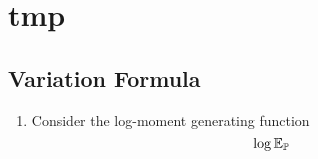 \chapter{tmp}

\section{Variation Formula}
\begin{enumerate}[label=\arabic{*}.]
	\item Consider the log-moment generating function
	\begin{equation*}
		\log \mathbb{E}_{\mathbb{P}}
	\end{equation*}






\end{enumerate}



































	